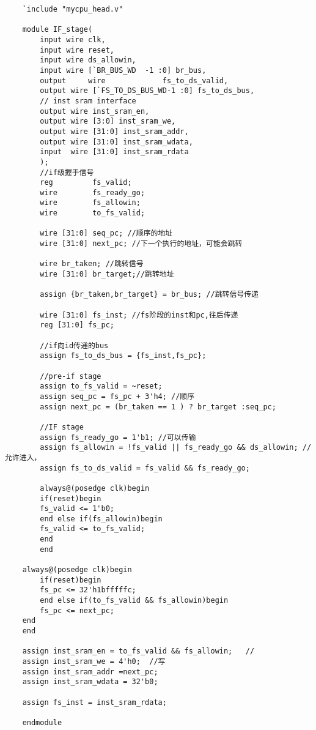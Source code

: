 \begin{lstlisting}
    `include "mycpu_head.v"

    module IF_stage(
        input wire clk,
        input wire reset,
        input wire ds_allowin,
        input wire [`BR_BUS_WD  -1 :0] br_bus,
        output     wire             fs_to_ds_valid,
        output wire [`FS_TO_DS_BUS_WD-1 :0] fs_to_ds_bus,
        // inst sram interface
        output wire inst_sram_en,
        output wire [3:0] inst_sram_we,
        output wire [31:0] inst_sram_addr,
        output wire [31:0] inst_sram_wdata,
        input  wire [31:0] inst_sram_rdata
        );
        //if级握手信号
        reg         fs_valid; 
        wire        fs_ready_go;
        wire        fs_allowin;
        wire        to_fs_valid; 
        
        wire [31:0] seq_pc; //顺序的地址
        wire [31:0] next_pc; //下一个执行的地址，可能会跳转
        
        wire br_taken; //跳转信号
        wire [31:0] br_target;//跳转地址
        
        assign {br_taken,br_target} = br_bus; //跳转信号传递
        
        wire [31:0] fs_inst; //fs阶段的inst和pc,往后传递
        reg [31:0] fs_pc;
        
        //if向id传递的bus
        assign fs_to_ds_bus = {fs_inst,fs_pc};
        
        //pre-if stage
        assign to_fs_valid = ~reset; 
        assign seq_pc = fs_pc + 3'h4; //顺序
        assign next_pc = (br_taken == 1 ) ? br_target :seq_pc; 
        
        //IF stage
        assign fs_ready_go = 1'b1; //可以传输
        assign fs_allowin = !fs_valid || fs_ready_go && ds_allowin; //允许进入，
        assign fs_to_ds_valid = fs_valid && fs_ready_go;
        
        always@(posedge clk)begin
        if(reset)begin
        fs_valid <= 1'b0;
        end else if(fs_allowin)begin
        fs_valid <= to_fs_valid;
        end
        end
        
    always@(posedge clk)begin
        if(reset)begin
        fs_pc <= 32'h1bfffffc;
        end else if(to_fs_valid && fs_allowin)begin
        fs_pc <= next_pc;
    end
    end
    
    assign inst_sram_en = to_fs_valid && fs_allowin;   //
    assign inst_sram_we = 4'h0;  //写
    assign inst_sram_addr =next_pc; 
    assign inst_sram_wdata = 32'b0; 
    
    assign fs_inst = inst_sram_rdata; 
    
    endmodule
\end{lstlisting}

